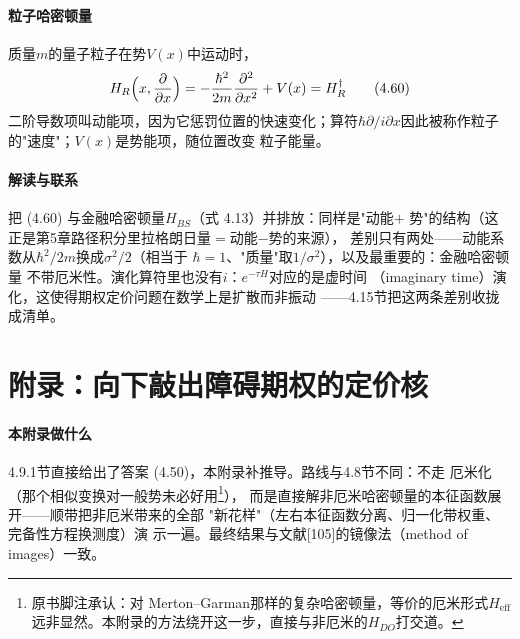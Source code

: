 \paragraph{粒子哈密顿量}
质量$m$的量子粒子在势$V(x)$中运动时，
\begin{equation*}
H_R\Bigl(x,\frac{\partial}{\partial x}\Bigr)
=-\frac{\hbar^{2}}{2m}\frac{\partial^{2}}{\partial x^{2}}+V(x)=H_R^{\dagger}
\tag{4.60}
\end{equation*}
二阶导数项叫动能项，因为它惩罚位置的快速变化；算符$\hbar\partial/
i\partial x$因此被称作粒子的"速度"；$V(x)$是势能项，随位置改变
粒子能量。

\paragraph{解读与联系}
把 (4.60) 与金融哈密顿量$H_{BS}$（式 4.13）并排放：同样是"动能$+$
势"的结构（这正是第5章路径积分里拉格朗日量$=$动能$-$势的来源），
差别只有两处——动能系数从$\hbar^{2}/2m$换成$\sigma^{2}/2$（相当于
$\hbar=1$、"质量"取$1/\sigma^{2}$），以及最重要的：金融哈密顿量
不带厄米性。演化算符里也没有$i$：$e^{-\tau H}$对应的是虚时间
（imaginary time）演化，这使得期权定价问题在数学上是扩散而非振动
——4.15节把这两条差别收拢成清单。

\section{附录：向下敲出障碍期权的定价核}

\paragraph{本附录做什么}
4.9.1节直接给出了答案 (4.50)，本附录补推导。路线与4.8节不同：不走
厄米化（那个相似变换对一般势未必好用\footnote{原书脚注承认：对
Merton--Garman那样的复杂哈密顿量，等价的厄米形式$H_{\mathrm{eff}}$
远非显然。本附录的方法绕开这一步，直接与非厄米的$H_{DO}$打交道。}），
而是直接解非厄米哈密顿量的本征函数展开——顺带把非厄米带来的全部
"新花样"（左右本征函数分离、归一化带权重、完备性方程换测度）演
示一遍。最终结果与文献[105]的镜像法（method of images）一致。

